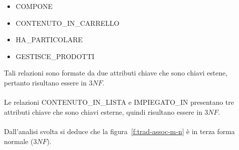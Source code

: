 \begin{itemize}
	
	\item
	COMPONE
	
	\item
	CONTENUTO\_IN\_CARRELLO
	
	\item
	HA\_PARTICOLARE
	
	\item
	GESTISCE\_PRODOTTI
	
\end{itemize}
Tali relazioni sono formate da due attributi chiave che sono chiavi estene, pertanto risultano essere in $3NF$. \\
\\
Le relazioni CONTENUTO\_IN\_LISTA e IMPIEGATO\_IN presentano tre attributi chiave che sono chiavi esterne, quindi risultano essere in $3NF$.\\
\\
Dall'analisi svolta si deduce che la figura~\vref{f:trad-assoc-m-n} è in terza forma normale ($3NF$).
